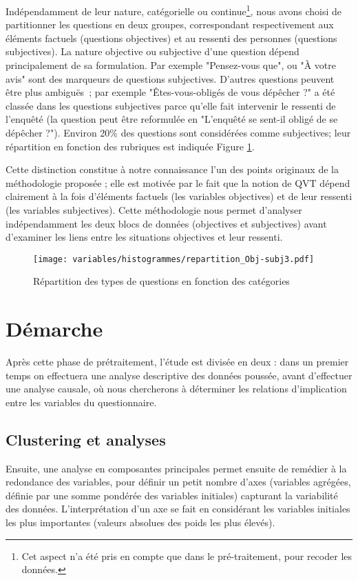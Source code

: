 \documentclass[11pt,fleqn,a4paper,openany,frenchb]{book} %
\begin{document}
Indépendamment de leur nature, catégorielle ou continue\footnote{Cet aspect n'a été pris en compte que dans le pré-traitement, pour recoder les données.}, nous avons choisi de partitionner les questions en deux groupes, correspondant respectivement aux éléments factuels (questions objectives) et au ressenti des personnes (questions subjectives). La nature objective ou subjective d'une question dépend principalement de sa formulation. Par  exemple "Pensez-vous que", ou "\`A votre avis" sont des marqueurs de questions subjectives.   D'autres questions peuvent être plus ambiguës~; par exemple "Êtes-vous-obligés de vous dépêcher ?" a été classée dans les questions subjectives parce qu'elle fait intervenir le ressenti de l'enquêté (la question peut être reformulée en "L'enquêté se sent-il obligé de se dépêcher ?"). Environ 20\% des questions sont considérées comme subjectives; leur répartition en fonction des rubriques 
est indiquée Figure \ref{fig:repar_objsubj}. \par

Cette distinction constitue à notre connaissance l'un des points originaux de la méthodologie proposée ; elle est motivée par le fait que la notion de QVT dépend clairement à la fois d'éléments factuels (les variables objectives) et de leur ressenti (les variables subjectives).  
Cette méthodologie nous permet d'analyser indépendamment les deux blocs de données (objectives et subjectives) avant d'examiner les liens entre les situations objectives et leur ressenti. \par

\begin{figure}[!h]
\center
\texttt{[image: variables/histogrammes/repartition\_Obj-subj3.pdf]}
\caption{Répartition des types de questions en fonction des catégories}
\label{fig:repar_objsubj}
\end{figure}

\section{Démarche}
Après cette phase de prétraitement, l'étude est divisée en deux : dans un premier temps on effectuera une analyse descriptive des données poussée, avant d'effectuer une analyse causale, où nous chercherons à déterminer les relations d'implication entre les variables du questionnaire.\par

\subsection{Clustering et analyses}
Ensuite, une analyse en composantes principales permet ensuite de remédier à la redondance des variables, pour définir un petit nombre d'axes (variables agrégées, définie par une somme pondérée des variables initiales) capturant la variabilité des données. L'interprétation d'un axe se fait en considérant les variables initiales les plus importantes (valeurs absolues des poids les plus élevés). \par
\end{document}
